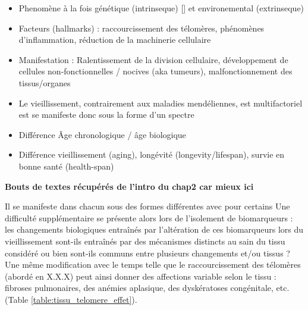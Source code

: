 


\begin{itemize}
    \item Phenomène à la fois génétique (intrinseque) [] et environemental (extrinseque) 
    \item Facteurs (hallmarks) : raccourcissement des télomères, phénomènes d'inflammation, réduction de la machinerie cellulaire
    \item Manifestation : Ralentissement de la division cellulaire, développement de cellules non-fonctionnelles / nocives (aka tumeurs), malfonctionnement des tissus/organes
    \item Le vieillissement, contrairement aux maladies mendéliennes, est multifactoriel est se manifeste donc sous la forme d'un spectre
    \item Différence Âge chronologique / âge biologique
    \item Différence vieillissement (aging), longévité (longevity/lifespan), survie en bonne santé (health-span) 
\end{itemize}

\textbf{Bouts de textes récupérés de l'intro du chap2 car mieux ici}

Il se manifeste dans chacun sous des formes différentes avec pour certains
Une difficulté supplémentaire se présente alors lors de l'isolement de biomarqueurs : les changements biologiques entraînés par l'altération de ces biomarqueurs lors du vieillissement sont-ils 
entraînés par des mécanismes distincts au sain du tissu considéré ou bien sont-ils communs entre plusieurs changements et/ou tissus ?
Une même modification avec le temps telle que le raccourcissement des télomères (abordé en X.X.X) peut ainsi donner des affections variable selon le tissu : fibroses pulmonaires, des anémies aplasique, des dyskératoses congénitale, etc. \cite{Armanios2012} (Table \ref{table:tissu_telomere_effet}). 


